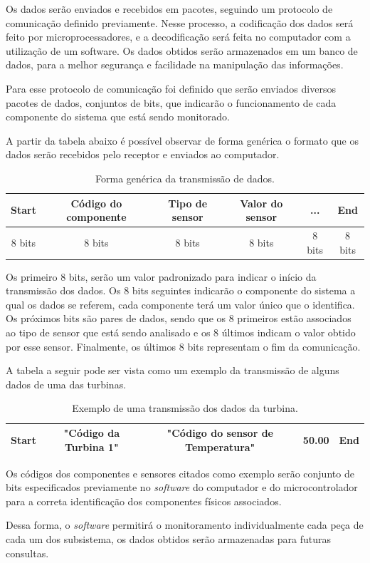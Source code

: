       Os dados serão enviados e recebidos em pacotes, seguindo um protocolo de comunicação definido previamente. Nesse processo, a codificação dos dados será feito por microprocessadores, e a decodificação será feita no computador com a utilização de um software. Os dados obtidos serão armazenados em um banco de dados, para a melhor segurança e facilidade na manipulação das informações.
	
      Para esse protocolo de comunicação foi definido que serão enviados diversos pacotes de dados, conjuntos de bits, que indicarão o funcionamento de cada componente do sistema que está sendo monitorado. 
      
      A partir da tabela abaixo é possível observar de forma genérica o formato que os dados serão recebidos pelo receptor e enviados ao computador.
      
      \begin{table}[h]
	\centering
	\begin{tabular}{|c|c|c|c|c|c|}

	\hline
	Start & Código do componente & Tipo de sensor & Valor do sensor & ... & End\\
	\hline                               
	8 bits & 8 bits & 8 bits & 8 bits & 8 bits & 8 bits\\
	\hline
	\end{tabular}
	\caption[Forma genérica da transmissão de dados]{Forma genérica da transmissão de dados.}
      \end{table}
      
      Os primeiro 8 bits, serão um valor padronizado para indicar o início da transmissão dos dados. Os 8 bits seguintes indicarão o componente do sistema a qual os dados se referem, cada componente terá um valor único que o identifica. Os próximos bits são pares de dados, sendo que os 8 primeiros estão associados ao tipo de sensor que está sendo analisado e os 8 últimos indicam o valor obtido por esse sensor. Finalmente, os últimos 8 bits representam o fim da comunicação.
      
      A tabela a seguir pode ser vista como um exemplo da transmissão de alguns dados de uma das turbinas.
      
      \begin{table}[h]
	\centering
	\begin{tabular}{|c|c|c|c|c|}

	\hline
	Start & "Código da Turbina 1" & "Código do sensor de Temperatura" & 50.00 & End\\
	\hline
	\end{tabular}
	\caption[Exemplo de uma transmissão dos dados da turbina]{Exemplo de uma transmissão dos dados da turbina.}
      \end{table}
      
      Os códigos dos componentes e sensores citados como exemplo serão conjunto de bits especificados previamente no \textit{software} do computador e do microcontrolador para a correta identificação dos componentes físicos associados.
      
      Dessa forma, o \textit{software} permitirá o monitoramento individualmente cada peça de cada um dos subsistema, os dados obtidos serão armazenadas para futuras consultas.
     